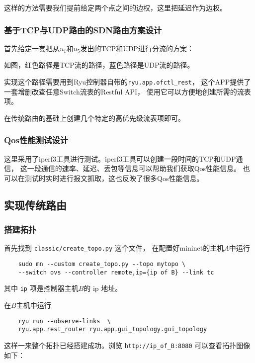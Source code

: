 这样的方法需要我们提前给定两个点之间的边权，这里把延迟作为边权。

\subsubsection{基于TCP与UDP路由的SDN路由方案设计}

首先给定一套把从$u_1$和$u_5$发出的TCP和UDP进行分流的方案：



如图，红色路径是TCP流的路径，蓝色路径是UDP流的路径。

实现这个路径需要用到Ryu控制器自带的\texttt{ryu.app.ofctl\_rest}，
这个APP提供了一套增删改查任意Switch流表的Restful API，
使用它可以方便地创建所需的流表项。

在传统路由的基础上创建几个特定的高优先级流表项即可。

\subsubsection{Qos性能测试设计}

这里采用了iperf3工具进行测试。iperf3工具可以创建一段时间的TCP和UDP通信，
这一段通信的速率、延迟、丢包等信息可以帮助我们获取Qos性能信息。
也可以在测试时实时进行报文抓取，这也反映了很多Qos性能信息。

\subsection{实现传统路由}

\subsubsection{搭建拓扑}

首先找到 \texttt{classic/create\_{}topo.py} 这个文件，
在配置好mininet的主机$A$中运行
\begin{lstlisting}
	sudo mn --custom create_topo.py --topo mytopo \
	--switch ovs --controller remote,ip={ip of B} --link tc
\end{lstlisting}

其中 \texttt{ip} 项是控制器主机$B$的 ip 地址。

在$B$主机中运行

\begin{lstlisting}
	ryu run --observe-links  \
	ryu.app.rest_router ryu.app.gui_topology.gui_topology
\end{lstlisting}

这样一来整个拓扑已经搭建成功。浏览 \texttt{http://ip\_of\_B:8080} 可以查看拓扑图像如下：

